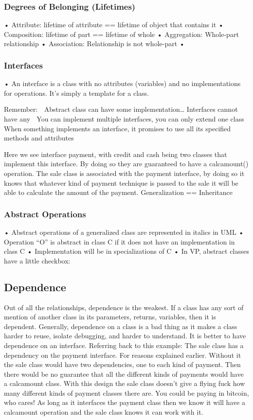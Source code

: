 \documentclass[11pt]{article}
\begin{document}
\subsubsection{Degrees of Belonging (Lifetimes)}
• Attribute: lifetime of attribute == lifetime of object that contains it
• Composition: lifetime of part == lifetime of whole
• Aggregation: Whole-part relationship
• Association: Relationship is not whole-part
•
\subsubsection{Interfaces}
• An interface is a class with no attributes (variables) and no implementations for operations. It's
simply a template for a class.

Remember:
 Abstract class can have some implementation… Interfaces cannot have any
 You can implement multiple interfaces, you can only extend one class
 When something implements an interface, it promises to use all its specified methods and attributes

Here we see interface payment, with credit and cash being two classes that implement this interface. By
doing so they are guaranteed to have a calcamount() operation.
The sale class is associated with the payment interface, by doing so it knows that whatever kind of payment
technique is passed to the sale it will be able to calculate the amount of the payment.
Generalization == Inheritance
\subsubsection{Abstract Operations}
• Abstract operations of a generalized class are represented in italics in UML
• Operation “O” is abstract in class C if it does not have an implementation in class C
• Implementation will be in specializations of C
• In VP, abstract classes have a little checkbox: 
\subsection{Dependence}
Out of all the relationships, dependence is the weakest. If a class has any sort of mention of another class
in its parameters, returns, variables, then it is dependent.
Generally, dependence on a class is a bad thing as it makes a class harder to reuse, isolate debugging, and
harder to understand. It is better to have dependence on an interface.
Referring back to this example: The sale class has a dependency on the payment interface. For reasons
explained earlier. Without it the sale class would have two dependencies, one to each kind of payment. Then
there would be no guarantee that all the different kinds of payments would have a calcamount class.
With this design the sale class doesn't give a flying fuck how many different kinds of payment classes there
are. You could be paying in bitcoin, who cares! As long as it interfaces the payment class then we know it will
have a calcamount operation and the sale class knows it can work with it. 
\end{document}
